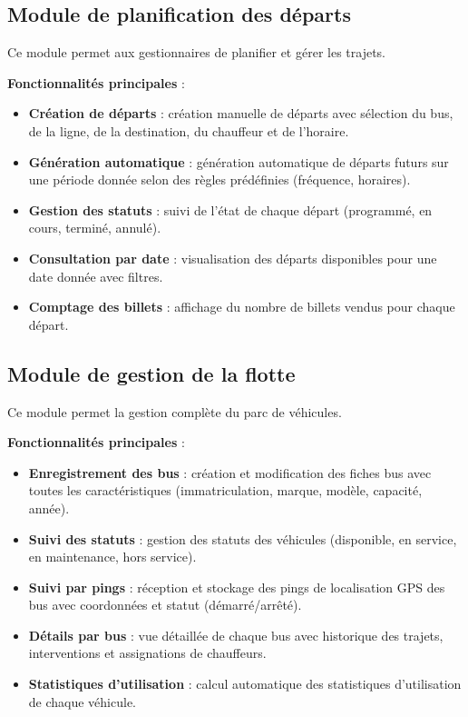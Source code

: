 \documentclass[a4paper, 12pt]{book}
\begin{document}
\subsection{Module de planification des départs}

Ce module permet aux gestionnaires de planifier et gérer les trajets.

\textbf{Fonctionnalités principales} :
\begin{itemize}
    \item \textbf{Création de départs} : création manuelle de départs avec sélection du bus, de la ligne, de la destination, du chauffeur et de l'horaire.
    \item \textbf{Génération automatique} : génération automatique de départs futurs sur une période donnée selon des règles prédéfinies (fréquence, horaires).
    \item \textbf{Gestion des statuts} : suivi de l'état de chaque départ (programmé, en cours, terminé, annulé).
    \item \textbf{Consultation par date} : visualisation des départs disponibles pour une date donnée avec filtres.
    \item \textbf{Comptage des billets} : affichage du nombre de billets vendus pour chaque départ.
\end{itemize}

\subsection{Module de gestion de la flotte}

Ce module permet la gestion complète du parc de véhicules.

\textbf{Fonctionnalités principales} :
\begin{itemize}
    \item \textbf{Enregistrement des bus} : création et modification des fiches bus avec toutes les caractéristiques (immatriculation, marque, modèle, capacité, année).
    \item \textbf{Suivi des statuts} : gestion des statuts des véhicules (disponible, en service, en maintenance, hors service).
    \item \textbf{Suivi par pings} : réception et stockage des pings de localisation GPS des bus avec coordonnées et statut (démarré/arrêté).
    \item \textbf{Détails par bus} : vue détaillée de chaque bus avec historique des trajets, interventions et assignations de chauffeurs.
    \item \textbf{Statistiques d'utilisation} : calcul automatique des statistiques d'utilisation de chaque véhicule.
\end{itemize}
\end{document}
